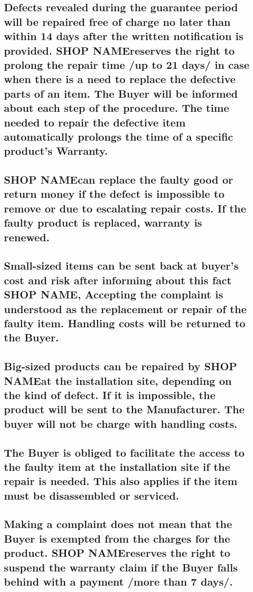 \documentclass[10pt,a4paper]{article}
\newcommand{\shopname}{SHOP NAME}
\begin{document}
\subsection{Defects revealed during the guarantee period  will be repaired  free of charge no later than within 14 days after the written notification is provided. \shopname reserves the right to prolong the repair time /up to 21 days/  in case when there is a need to  replace the defective parts of an item. The Buyer will be informed about each step of the procedure.
The time needed to repair the defective item automatically prolongs the time of a specific product’s Warranty.}


\subsection{\shopname can replace the faulty good or return money if the defect is impossible to remove or due to escalating repair costs.
If the faulty product is replaced, warranty is renewed.}

\subsection{ Small-sized items can be sent back at buyer’s cost and risk after informing about this fact \shopname,
Accepting the complaint is understood as the replacement or repair of the faulty item. Handling costs will be returned to the Buyer.}

\subsection{Big-sized products can be repaired by \shopname at the installation site, depending on the kind of defect. If it is impossible, the product will be sent to the Manufacturer. The buyer will not be charge with handling costs.}

\subsection{The Buyer is obliged to facilitate the access to the faulty item at the installation site if the repair is needed. This also applies if the item must be disassembled or serviced.}

\subsection{Making a complaint does not mean that the Buyer  is exempted from the charges for the product. \shopname reserves the right to suspend the warranty claim if the Buyer falls behind with a payment /more than 7 days/.}
\end{document}
